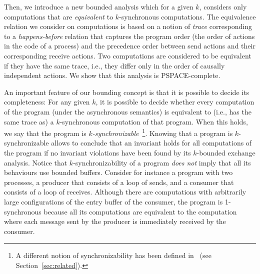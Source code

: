 Then, we introduce a new bounded analysis which %
for a given $k$, considers only computations that are {\em equivalent} to $k$-synchronous computations. The equivalence relation we consider on computations is based on a notion of {\em trace} corresponding to a {\em happens-before} relation that captures the program order (the order of actions in the code of a process) and the precedence order between send actions and their corresponding receive actions. Two computations are considered to be equivalent if they have the same trace, i.e., they differ only in the order of causally independent actions. 
We show that this analysis is PSPACE-complete.
%

An important feature of our bounding concept is that it is possible to decide its completeness: For any given $k$, it is possible to decide whether every computation of the program (under the asynchronous semantics) is equivalent to (i.e., has the same trace as) a $k$-synchronous computation of that program. 
When this holds, we say that the program is {\em $k$-synchronizable}~\footnote{A different notion of synchronizability has been defined in~\cite{DBLP:journals/tcs/BasuB16} (see Section~\ref{sec:related}).}. Knowing that a program is $k$-synchronizable allows to conclude that an invariant holds for all computations of the program if no invariant violations have been found by its $k$-bounded exchange analysis. Notice that $k$-synchronizability of a program {\em does not} imply that all its behaviours use bounded buffers.
Consider for instance a program with two processes, a producer that consists of a loop of sends, and a consumer that consists of a loop of receives. Although there are computations with arbitrarily large configurations of the entry buffer of the consumer, the program is 1-synchronous because all its computations are equivalent to the computation where each message sent by the producer is immediately received by the consumer. 


